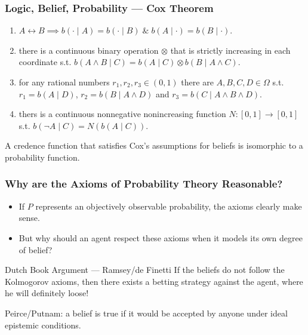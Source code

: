 \documentclass[UTF8,11pt,colorlinks,compress,openany]{beamer}%
\begin{document}
\begin{frame}\frametitle{Logic, Belief, Probability --- Cox Theorem}
\begin{center}
\end{center}
\begin{assumption}
\begin{enumerate}
	\item $A\leftrightarrow B\implies b(\cdot\mid A)=b(\cdot\mid B)\;\&\;b(A\mid\cdot)=b(B\mid\cdot)$.
	\item there is a continuous binary operation $\otimes$ that is strictly increasing in each coordinate s.t. $b(A\wedge B\mid C)=b(A\mid C)\otimes b(B\mid A\wedge C)$.
	\item for any rational numbers $r_1,r_2,r_3\in (0,1)$ there are $A,B,C,D\in\Omega$ s.t. $r_1=b(A\mid D)$, $r_2=b(B\mid A\wedge D)$ and $r_3=b(C\mid A\wedge B\wedge D)$.
	\item thers is a continuous nonnegative nonincreasing function $N: [0,1]\to [0,1]$ s.t. $b(\neg A\mid C)=N(b(A\mid C))$.
\end{enumerate}
\end{assumption}
\begin{theorem}
A credence function that satisfies Cox's assumptions for beliefs is isomorphic to a probability function.
\end{theorem}
\end{frame}

\begin{frame}\frametitle{Why are the Axioms of Probability Theory Reasonable?}
\begin{itemize}
	\item If $P$ represents an objectively observable probability, the axioms clearly make sense.
	\item But why should an agent respect these axioms when it models its own degree of belief?
\end{itemize}
\begin{block}{Dutch Book Argument --- Ramsey/de Finetti}
If the beliefs do not follow the Kolmogorov axioms, then there exists a betting strategy against the agent, where he will definitely loose!
\end{block}
Peirce/Putnam: a belief is true if it would be accepted by anyone under ideal epistemic conditions.
\end{frame}
\end{document}
